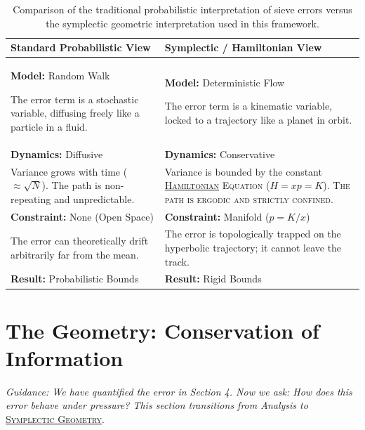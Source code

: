 \documentclass[sn-mathphys-num, pdflatex]{sn-jnl}
\newcommand{\gterm}[2]{\begingroup\normalfont\scshape\hyperlink{#1}{#2}\endgroup}
\begin{document}
\begin{table}[ht]
\centering
\renewcommand{\arraystretch}{1.5}
\begin{tabular}{|>{\raggedright\arraybackslash}p{}|>{\raggedright\arraybackslash}p{}|}
\hline
\hline
\textbf{Standard Probabilistic View} & \textbf{Symplectic / Hamiltonian View} \\ \hline
\raggedright
\textbf{Model:} Random Walk \par \vspace{0.4em}
The error term is a stochastic variable, diffusing freely like a particle in a fluid. &
\textbf{Model:} Deterministic Flow \par \vspace{0.4em}
\raggedright\arraybackslash The error term is a kinematic variable, locked to a trajectory like a planet in orbit.
\\ \hline 
\textbf{Dynamics:} Diffusive & \textbf{Dynamics:} Conservative \\
Variance grows with time ($ \approx \sqrt{N} $). The path is non-repeating and unpredictable. & Variance is bounded by the constant \gterm{hamiltonian}{Hamiltonian} Equation ($H=xp=K$). The path is ergodic and strictly confined. \\ \hline
\textbf{Constraint:} None (Open Space) & \textbf{Constraint:} Manifold ($p = K/x$) \\
The error can theoretically drift arbitrarily far from the mean. & The error is topologically trapped on the hyperbolic trajectory; it cannot leave the track. \\ \hline
\textbf{Result:} Probabilistic Bounds & \textbf{Result:} Rigid Bounds \\
\hline
\end{tabular}
\caption{Comparison of the traditional probabilistic interpretation of sieve errors versus the symplectic geometric interpretation used in this framework.}
\end{table}

\section{The Geometry: Conservation of Information}
\label{sec:geom}

\textit{Guidance: We have quantified the error in Section 4. Now we ask: How does this error behave under pressure? This section transitions from Analysis to} \gterm{geometry}{Symplectic Geometry}.
\end{document}

